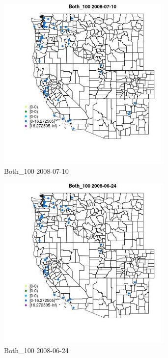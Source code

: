 \begin{figure} 
\centering  
\includegraphics[width=0.77\textwidth]{Code_Outputs/Report_ML_input_PM25_Step4_part_e_de_duplicated_aves_MapObsBoth_1002008-07-10.jpg} 
\caption{\label{fig:Report_ML_input_PM25_Step4_part_e_de_duplicated_avesMapObsBoth_1002008-07-10}Both_100 2008-07-10} 
\end{figure} 
 

\clearpage 

\begin{figure} 
\centering  
\includegraphics[width=0.77\textwidth]{Code_Outputs/Report_ML_input_PM25_Step4_part_e_de_duplicated_aves_MapObsBoth_1002008-06-24.jpg} 
\caption{\label{fig:Report_ML_input_PM25_Step4_part_e_de_duplicated_avesMapObsBoth_1002008-06-24}Both_100 2008-06-24} 
\end{figure} 
 

